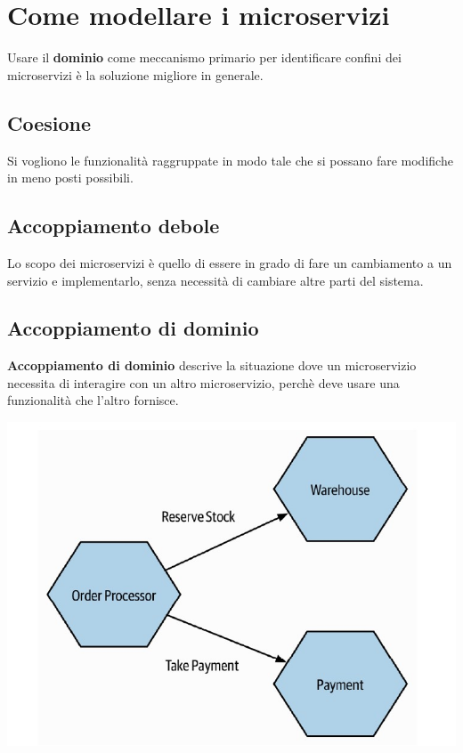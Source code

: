 \section{Come modellare i microservizi}
Usare il \textbf{dominio} come meccanismo primario per identificare confini dei microservizi è la soluzione migliore in generale. 
\subsection{Coesione}
Si vogliono le funzionalità raggruppate in modo tale che si possano fare modifiche in meno posti possibili.

\subsection{Accoppiamento debole}
Lo scopo dei microservizi è quello di essere in grado di fare un cambiamento a un servizio e implementarlo, senza necessità di cambiare altre parti del sistema.

\subsection{Accoppiamento di dominio}
\textbf{Accoppiamento di dominio} descrive la situazione dove un microservizio necessita di interagire con un altro microservizio, perchè deve usare una funzionalità che l'altro fornisce.
\begin{center}
    \includegraphics[scale = 0.4]{Images/SOA/ModelMicroservices.jpg}
\end{center}

